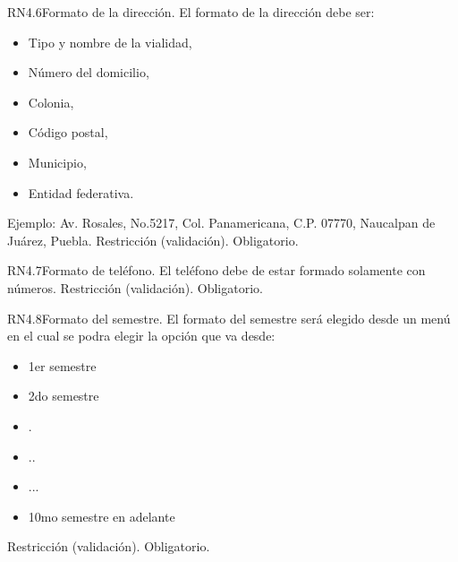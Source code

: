 
\begin{BussinesRule}{RN4.6}{Formato de la dirección.} 
	\BRitem[Descripción:]El formato de la dirección debe ser:
		\begin{itemize}
			\item Tipo y nombre de la vialidad, 
			\item Número del domicilio, 
			\item Colonia, 
			\item Código postal, 
			\item Municipio, 
			\item Entidad federativa.
		\end{itemize}
	Ejemplo: Av. Rosales, No.5217, Col. Panamericana, C.P. 07770, Naucalpan de Juárez, Puebla.	
	\BRitem[Tipo:] Restricción (validación).
	\BRitem[Nivel:] Obligatorio.
\end{BussinesRule}


\begin{BussinesRule}{RN4.7}{Formato de teléfono.} 
	\BRitem[Descripción:] El teléfono debe de estar formado solamente con números.
	\BRitem[Tipo:] Restricción (validación).
	\BRitem[Nivel:] Obligatorio.
\end{BussinesRule}


\begin{BussinesRule}{RN4.8}{Formato del semestre.} 
	\BRitem[Descripción:] El formato del semestre será elegido desde un menú en el cual se podra elegir la opción que va desde:
		\begin{itemize}
			\item 1er semestre
			\item 2do semestre
			\item .
			\item ..
			\item ...
			\item 10mo semestre en adelante
		\end{itemize}
	\BRitem[Tipo:] Restricción (validación).
	\BRitem[Nivel:] Obligatorio.
\end{BussinesRule}


